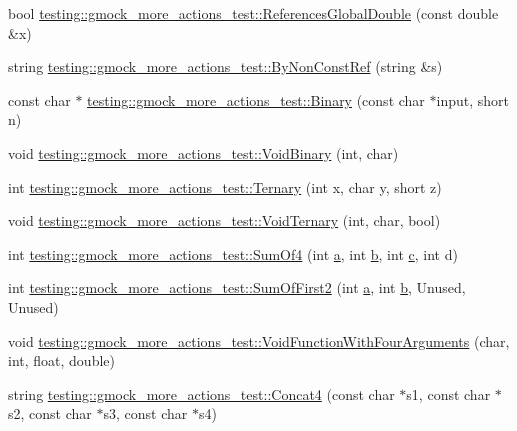 \begin{DoxyCompactItemize}
bool \hyperlink{namespacetesting_1_1gmock__more__actions__test_ae2d3dddc96f5657127593f129cd3fc51}{testing\+::gmock\+\_\+more\+\_\+actions\+\_\+test\+::\+References\+Global\+Double} (const double \&x)
\item 
string \hyperlink{namespacetesting_1_1gmock__more__actions__test_ac0099e2d9f40351252df31feda822b71}{testing\+::gmock\+\_\+more\+\_\+actions\+\_\+test\+::\+By\+Non\+Const\+Ref} (string \&s)
\item 
const char $\ast$ \hyperlink{namespacetesting_1_1gmock__more__actions__test_a853c9f048674a60798b930750b74a1df}{testing\+::gmock\+\_\+more\+\_\+actions\+\_\+test\+::\+Binary} (const char $\ast$input, short n)
\item 
void \hyperlink{namespacetesting_1_1gmock__more__actions__test_aec71bd163ae67ec97e073bd13a4ac039}{testing\+::gmock\+\_\+more\+\_\+actions\+\_\+test\+::\+Void\+Binary} (int, char)
\item 
int \hyperlink{namespacetesting_1_1gmock__more__actions__test_ab98b352528a0b72625b4710a6fc648a1}{testing\+::gmock\+\_\+more\+\_\+actions\+\_\+test\+::\+Ternary} (int x, char y, short z)
\item 
void \hyperlink{namespacetesting_1_1gmock__more__actions__test_ac41b49dc8ab365ccad7b332796421cd4}{testing\+::gmock\+\_\+more\+\_\+actions\+\_\+test\+::\+Void\+Ternary} (int, char, bool)
\item 
int \hyperlink{namespacetesting_1_1gmock__more__actions__test_a41c348fff8608825239a276b8426a475}{testing\+::gmock\+\_\+more\+\_\+actions\+\_\+test\+::\+Sum\+Of4} (int \hyperlink{_07copy_08_2_read_camera_model_8m_a551a3d351eadcc0b9b1a2f24f0fb5ea0}{a}, int \hyperlink{jquery_8js_a2fa551895933fae935a0a6b87282241d}{b}, int \hyperlink{jquery_8js_abce695e0af988ece0826d9ad59b8160d}{c}, int d)
\item 
int \hyperlink{namespacetesting_1_1gmock__more__actions__test_aaa60ddffb96ddc3a73b0b22929ca5bec}{testing\+::gmock\+\_\+more\+\_\+actions\+\_\+test\+::\+Sum\+Of\+First2} (int \hyperlink{_07copy_08_2_read_camera_model_8m_a551a3d351eadcc0b9b1a2f24f0fb5ea0}{a}, int \hyperlink{jquery_8js_a2fa551895933fae935a0a6b87282241d}{b}, Unused, Unused)
\item 
void \hyperlink{namespacetesting_1_1gmock__more__actions__test_a8c952be61635486e84c1eca3bf3acd9b}{testing\+::gmock\+\_\+more\+\_\+actions\+\_\+test\+::\+Void\+Function\+With\+Four\+Arguments} (char, int, float, double)
\item 
string \hyperlink{namespacetesting_1_1gmock__more__actions__test_aa423cedcbd858249b616f0c537a1e4cf}{testing\+::gmock\+\_\+more\+\_\+actions\+\_\+test\+::\+Concat4} (const char $\ast$s1, const char $\ast$s2, const char $\ast$s3, const char $\ast$s4)

\end{DoxyCompactItemize}

